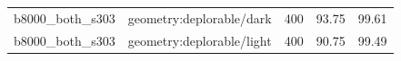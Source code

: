 \begin{longtable}{l>{\raggedright\arraybackslash}p{.42\linewidth}rrr}
b8000\_\allowbreak{}both\_\allowbreak{}s303 & %
geometry:deplorable/dark & %
400 & %
93.75 & %
99.61 \\ %

b8000\_\allowbreak{}both\_\allowbreak{}s303 & %
geometry:deplorable/light & %
400 & %
90.75 & %
99.49 \\ %


\end{longtable}
